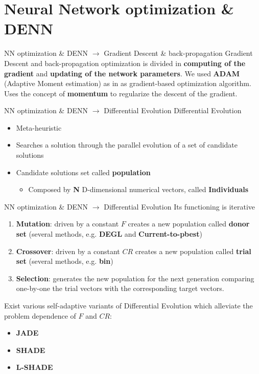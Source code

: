 \documentclass[xcolor={usenames}]{beamer}
\begin{document}
  \section{Neural Network optimization \& DENN}
  \begin{frame}{NN optimization \& DENN \(\rightarrow\) Gradient Descent \& back-propagation}
  	Gradient Descent and back-propagation optimization is divided in \textbf{computing of the gradient} and \textbf{updating of the network parameters}.\newline\newline
  	We used \textbf{ADAM} (Adaptive Moment estimation) \cite{Kingma2014AdamAM} as in \cite{NRAM:2016} as gradient-based optimization algorithm. Uses the concept of \textbf{momentum} to regularize the descent of the gradient.
  \end{frame}
  \begin{frame}{NN optimization \& DENN \(\rightarrow\) Differential Evolution}
  	Differential Evolution
  	\begin{itemize}  		
  		\item{Meta-heuristic}
  		\item{Searches a solution through the parallel evolution of a set of candidate solutions}
  		\item{Candidate solutions set called \textbf{population}
  			\begin{itemize}
  				\item{Composed by \textbf{N} D-dimensional numerical vectors, called \textbf{Individuals}}
  			\end{itemize}}
  	\end{itemize}
  \end{frame}
  \begin{frame}{NN optimization \& DENN \(\rightarrow\) Differential Evolution}
  	Its functioning is iterative
  	\vspace{-0.175cm}
  	\begin{enumerate}
  		\item{\textbf{Mutation}: driven by a constant $F$ creates a new population called \textbf{donor set} (several methods, e.g. \textbf{DEGL} and \textbf{Current-to-pbest})}
  		\item{\textbf{Crossover}: driven by a constant $CR$ creates a new population called \textbf{trial set} (several methods, e.g. \textbf{bin})}
  		\item{\textbf{Selection}: generates the new population for the next generation comparing one-by-one the trial vectors with the corresponding target vectors.}
  	\end{enumerate}
  	\vspace{-0.175cm}
  	Exist various self-adaptive variants of Differential Evolution which alleviate the problem dependence of $F$ and $CR$:
  	\vspace{-0.175cm}
  	\begin{itemize}
  		\item{\textbf{JADE}}
  		\item{\textbf{SHADE}}
  		\item{\textbf{L-SHADE}}
  	\end{itemize}
  \end{frame}
\end{document}
